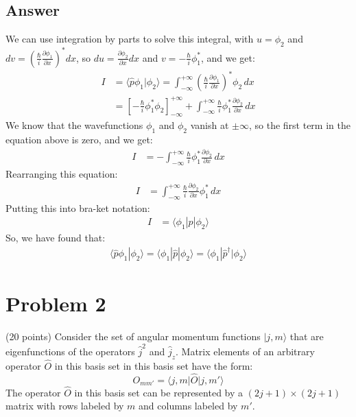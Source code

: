 \documentclass{article}
\begin{document}
\subsection{Answer}
We can use integration by parts to solve this integral, with $u = \phi _2$ and $dv = \left( \frac{\hbar}{i} \frac{\partial \phi_1}{\partial x} \right)^*dx$, so $du = \frac{\partial \phi_2}{\partial x}dx$ and $v = -\frac{\hbar}{i} \phi_1^*$, and we get:
\begin{align}
I &= \langle \hat{p}\phi_1 | \phi_2 \rangle = \int_{-\infty}^{+\infty} \left( \frac{\hbar}{i} \frac{\partial \phi_1}{\partial x} \right)^* \phi_2 \, dx \\
&= \left[ -\frac{\hbar}{i} \phi_1^* \phi_2 \right]_{-\infty}^{+\infty} + \int_{-\infty}^{+\infty} \frac{\hbar}{i} \phi_1^* \frac{\partial \phi_2}{\partial x} \, dx
\end{align}
We know that the wavefunctions $\phi _1$ and $\phi _2$ vanish at $\pm \infty$, so the first term in the equation above is zero, and we get:
\begin{align}
I &= - \int_{-\infty}^{+\infty} \frac{\hbar}{i} \phi_1^* \frac{\partial \phi_2}{\partial x} \, dx
\end{align}
Rearranging this equation:
\begin{align}
I &= \int_{-\infty}^{+\infty} \frac{\hbar}{i} \frac{\partial \phi_2}{\partial x} \phi_1^* \, dx
\end{align}
Putting this into bra-ket notation:
\begin{align}
I &= \langle \phi_1 | \hat{p} | \phi_2 \rangle
\end{align}
So, we have found that:
\begin{align}
\langle \hat{p}\phi_1 | \phi_2 \rangle = \langle \phi_1 | \hat{p} | \phi_2 \rangle = \langle \phi_1 | \hat{p}^\dagger | \phi_2 \rangle
\end{align}

\section{Problem 2}
(20 points) Consider the set of angular momentum functions \( \lvert j, m \rangle \) that are eigenfunctions of the operators \( \hat{j}^2 \) and \( \hat{j}_z \). Matrix elements of an arbitrary operator \( \hat{O} \) in this basis set in this basis set have the form:
\[
O_{mm'} = \langle j, m \lvert \hat{O} \lvert j, m' \rangle
\]
The operator \( \hat{O} \) in this basis set can be represented by a \( (2j+1) \times (2j+1) \) matrix with rows labeled by \( m \) and columns labeled by \( m' \).
\end{document}
